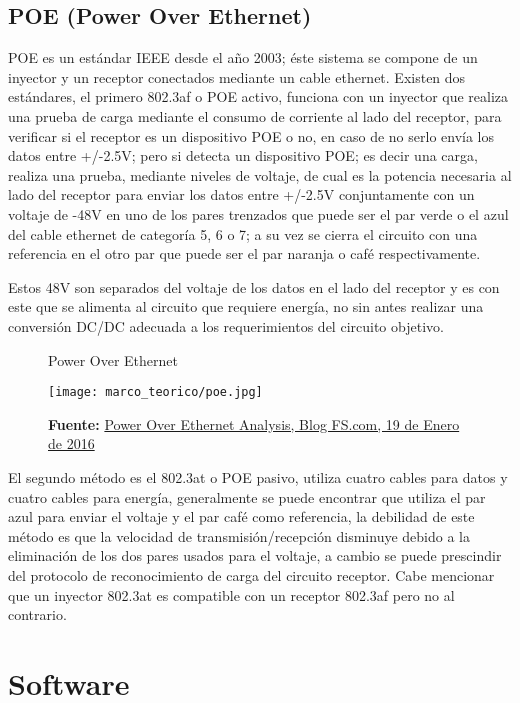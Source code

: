 \documentclass[../principal]{subfiles}
\begin{document}
  \subsection{POE (Power Over Ethernet)}

  POE es un estándar IEEE desde el año 2003; éste sistema se compone de un inyector y un receptor conectados mediante un cable ethernet.
  Existen dos estándares, el primero 802.3af o POE activo, funciona con un inyector que realiza una prueba de carga mediante el consumo de corriente al lado del receptor, para verificar si el receptor es un dispositivo POE o no, en caso de no serlo envía los datos entre +/-2.5V; pero si detecta un dispositivo POE; es decir una carga, realiza una prueba, mediante niveles de voltaje, de cual es la potencia necesaria al lado del receptor para enviar los datos entre +/-2.5V conjuntamente con un voltaje de -48V en uno de los pares trenzados que puede ser el par verde o el azul del cable ethernet de categoría 5, 6 o 7; a su vez se cierra el circuito con una referencia en el otro par que puede ser el par naranja o café respectivamente.

  Estos 48V son separados del voltaje de los datos en el lado del receptor y es con este que se alimenta al circuito que requiere energía, no sin antes realizar una conversión DC/DC adecuada a los requerimientos del circuito objetivo.

  \begin{figure}[h]
    \centering
	  \caption{Power Over Ethernet}
	  \texttt{[image: marco\_teorico/poe.jpg]}
	  \caption*{\textbf{Fuente:} \href{http://www.fs.com/blog/power-over-ethernet-analysis.html}{Power Over Ethernet Analysis, Blog FS.com, 19 de Enero de 2016}}
  \end{figure}

  El segundo método es el 802.3at o POE pasivo, utiliza cuatro cables para datos y cuatro cables para energía, generalmente se puede encontrar que utiliza el par azul para enviar el voltaje y el par café como referencia, la debilidad de este método es que la velocidad de transmisión/recepción disminuye debido a la eliminación de los dos pares usados para el voltaje, a cambio se puede prescindir del protocolo de reconocimiento de carga del circuito receptor. Cabe mencionar que un inyector 802.3at es compatible con un receptor 802.3af pero no al contrario.

  \section{Software}
\end{document}
